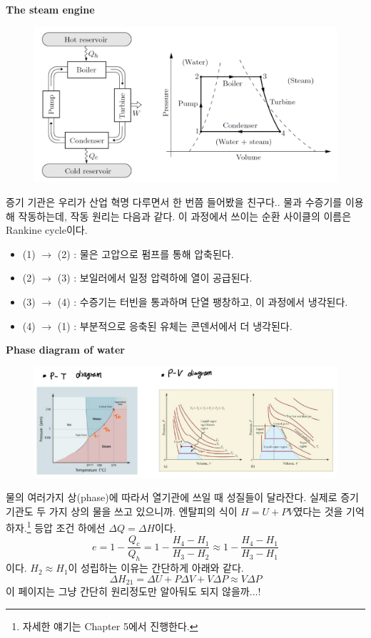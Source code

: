 \documentclass{article}
\begin{document}
\newpage

\noindent
\textbf{The steam engine}

\begin{figure}[h]
    \centering
    \includegraphics[width=0.7\linewidth]{images/fig3_3.png}
\end{figure}

증기 기관은 우리가 산업 혁명 다루면서 한 번쯤 들어봤을 친구다.. 물과 수증기를 이용해 작동하는데, 작동 원리는 다음과 같다. 이 과정에서 쓰이는 순환 사이클의 이름은 Rankine cycle이다.
\begin{itemize}
    \item (1) $\rightarrow$ (2) : 물은 고압으로 펌프를 통해 압축된다.
    \item (2) $\rightarrow$ (3) : 보일러에서 일정 압력하에 열이 공급된다.
    \item (3) $\rightarrow$ (4) : 수증기는 터빈을 통과하며 단열 팽창하고, 이 과정에서 냉각된다.
    \item (4) $\rightarrow$ (1) : 부분적으로 응축된 유체는 콘덴서에서 더 냉각된다.
\end{itemize}

\noindent
\textbf{Phase diagram of water}

\begin{figure}[h]
    \centering
    \includegraphics[width=0.85\linewidth]{images/fig3_4.png}
\end{figure}

\noindent
물의 여러가지 상(phase)에 따라서 열기관에 쓰일 때 성질들이 달라잔다. 실제로 증기 기관도 두 가지 상의 물을 쓰고 있으니까. 엔탈피의 식이 $H = U + PV$였다는 것을 기억하자.\footnote{자세한 얘기는 Chapter 5에서 진행한다.} 등압 조건 하에선 $\Delta Q = \Delta H$이다.
\begin{equation}
    e = 1 - \frac{Q_c}{Q_h} = 1 - \frac{H_4 - H_1}{H_3 - H_2} \approx 1 - \frac{H_4 - H_1}{H_3 - H_1}
\end{equation}
이다. $H_2 \approx H_1$이 성립하는 이유는 간단하게 아래와 같다.
\begin{equation}
    \Delta H_{21} = \Delta U + P \Delta V + V \Delta P \approx V \Delta P
\end{equation}
이 페이지는 그냥 간단히 원리정도만 알아둬도 되지 않을까...!
\end{document}
